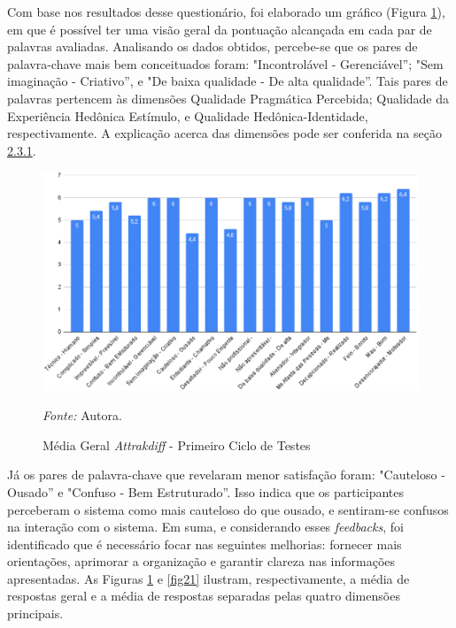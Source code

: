Com base nos resultados desse questionário, foi elaborado um gráfico (Figura \ref{fig20}), em que é possível ter uma visão geral da pontuação alcançada em cada par de palavras avaliadas. Analisando os dados obtidos, percebe-se que os pares de palavra-chave mais bem conceituados foram: "Incontrolável - Gerenciável''; "Sem imaginação - Criativo'', e "De baixa qualidade - De alta qualidade''. 
Tais pares de palavras pertencem às dimensões Qualidade Pragmática Percebida; Qualidade da Experiência Hedônica Estímulo, e Qualidade Hedônica-Identidade, respectivamente. A explicação acerca das dimensões 
pode ser conferida na seção \hyperref[sec:Medicao2]{2.3.1}. 

\begin{figure}[h!]
	\centering
	\caption{Média Geral \textit{Attrakdiff} - Primeiro Ciclo de Testes}
	\begin{adjustbox}{center}
		\includegraphics[width=1\textwidth]{figuras/media-geral.eps}
	\end{adjustbox}
	\begin{tablenotes}[flushleft]
		\centering
		\item \textit{Fonte:} Autora.
	\end{tablenotes}
	\label{fig20}
\end{figure}

Já os pares de palavra-chave que revelaram menor satisfação foram: "Cauteloso - Ousado'' e "Confuso - Bem Estruturado''. Isso indica que os participantes perceberam o sistema como mais cauteloso do que ousado, e 
sentiram-se confusos na interação com o sistema. Em suma, e considerando esses \textit{feedbacks}, foi identificado que é necessário focar nas seguintes melhorias: fornecer mais orientações, aprimorar a 
organização e garantir clareza nas informações apresentadas. As Figuras \ref{fig20} e \ref{fig21} ilustram, respectivamente, a média de respostas geral e a média de respostas separadas pelas quatro dimensões principais. 

